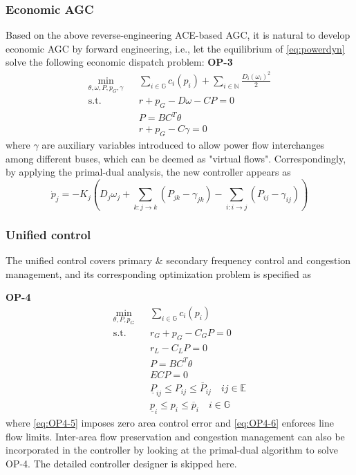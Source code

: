 \documentclass[journal,12pt,onecolumn,draftclsnofoot]{IEEEtran}
\begin{document}
\subsubsection{Economic AGC \cite{li2016connecting}}

Based on the above reverse-engineering ACE-based AGC, it is natural to develop economic AGC by forward engineering, i.e., let the equilibrium of \eqref{eq:powerdyn} solve the following economic dispatch problem:
\noindent
\textbf{OP-3}
\begin{subequations}
	\begin{eqnarray}
	\min_{\theta, \omega, P, p_G,\gamma} && \sum_{i\in\mathbb{G}} c_i(p_i) +\sum_{i\in\mathbb{N}} \frac{D_i (\omega_i)^2}{2} \\
	\mathrm{s.t.} && r+p_G-D\omega-CP=0 \\
	&& P=BC^T\theta\\
	\label{eq:OP3-4}
	&& r+p_G-C\gamma=0
	\end{eqnarray}\label{eq:OP3}%
\end{subequations}
where $\gamma$ are auxiliary variables introduced to allow power flow interchanges among different buses, which can be deemed as "virtual flows". Correspondingly, by applying the primal-dual analysis, the new controller appears as
\begin{equation}\label{eq:econAGCctr}
\dot p_j=-K_j\left(D_j\omega_j+\sum_{k:j\rightarrow k} (P_{jk} - \gamma_{jk} )-\sum_{i:i\rightarrow j} (P_{ij} -\gamma_{ij} )\right)
\end{equation}

\subsubsection{Unified  control \cite{zhao2016unified}}
The unified control covers primary \& secondary frequency control and congestion management, and its corresponding optimization problem is specified as 

\noindent
\textbf{OP-4}
\begin{subequations}
	\begin{eqnarray}
	\min_{\theta, P, p_G} && \sum_{i\in\mathbb{G}} c_i(p_i)  \\ %
	\mathrm{s.t.} && r_G+p_G-C_G P=0 \\
	&& r_L-C_LP=0\\
	&& P=BC^T\theta\\
		\label{eq:OP4-5}
	&& ECP=0 \\
		\label{eq:OP4-6}
	&& \underline{P}_{ij} \le P_{ij} \le \overline{P}_{ij}   \quad ij \in \mathbb{E} \\
	\label{eq:OP4-7}
	&& \underline{p}_i \le p_i \le \overline{p}_i \quad   i \in \mathbb{G}
	\end{eqnarray}\label{eq:OP4}%
\end{subequations}
where \eqref{eq:OP4-5} imposes zero area control error and \eqref{eq:OP4-6} enforces line flow limits. Inter-area flow preservation and congestion management can also be incorporated in the controller by looking at the primal-dual algorithm to solve OP-4. The detailed controller designer is skipped here. 
\end{document}
